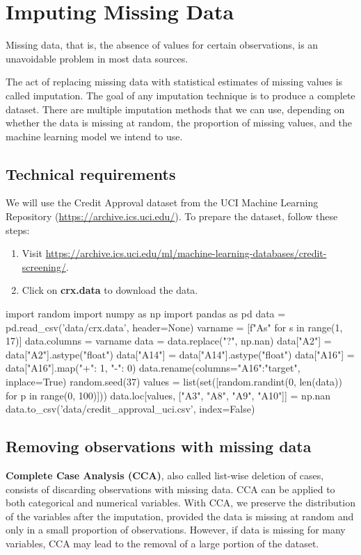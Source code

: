 \chapter{Imputing Missing Data}
Missing data, that is, the absence of values for certain observations, is an unavoidable problem in most data sources.

The act of replacing missing data with statistical estimates of missing values is called imputation.
The goal of any imputation technique is to produce a complete dataset. There are multiple imputation
methods that we can use, depending on whether the data is missing at random, the proportion of
missing values, and the machine learning model we intend to use.

\section{Technical requirements}
We will use the Credit Approval dataset from the UCI Machine Learning Repository (\url{https://archive.ics.uci.edu/}). To prepare the dataset, follow these steps:
\begin{enumerate}
    \item Visit \url{https://archive.ics.uci.edu/ml/machine-learning-databases/credit-screening/}.
    \item Click on \textbf{crx.data} to download the data.
\end{enumerate}
\begin{pyc}
import random
import numpy as np
import pandas as pd
data = pd.read_csv('data/crx.data', header=None)
varname = [f"A{s}" for s in range(1, 17)]
data.columns = varname
data = data.replace("?", np.nan)
data["A2"] = data["A2"].astype("float")
data["A14"] = data["A14"].astype("float")
data["A16"] = data["A16"].map({"+": 1, "-": 0})
data.rename(columns={"A16":"target"}, inplace=True)
random.seed(37)
values = list(set([random.randint(0, len(data)) for p in range(0, 100)]))
data.loc[values, ["A3", "A8", "A9", "A10"]] = np.nan
data.to_csv('data/credit_approval_uci.csv', index=False)
\end{pyc}


\section{Removing observations with missing data}
\textbf{Complete Case Analysis (CCA)}, also called list-wise deletion of cases, consists of discarding observations
with missing data. CCA can be applied to both categorical and numerical variables. With CCA, we
preserve the distribution of the variables after the imputation, provided the data is missing at random
and only in a small proportion of observations. However, if data is missing for many variables, CCA
may lead to the removal of a large portion of the dataset.
